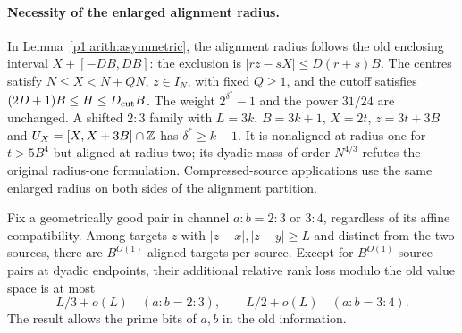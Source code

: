 \paragraph{Necessity of the enlarged alignment radius.}
In Lemma~\ref{p1:arith:asymmetric}, the alignment radius follows the
old enclosing interval $X+[-DB,DB]$: the exclusion is
$|rz-sX|\le D(r+s)B$. The centres satisfy
$N\le X<N+QN$, $z\in I_N$, with fixed $Q\ge1$, and the cutoff satisfies
$(2D+1)B\le H\le D_{\rm cut}B$. The weight $2^{\delta^*}-1$ and the
power $31/24$ are unchanged. A shifted $2:3$ family with
$L=3k$, $B=3k+1$, $X=2t$, $z=3t+3B$ and
$U_X=[X,X+3B]\cap\mathbb Z$ has $\delta^*\ge k-1$. It is nonaligned at
radius one for $t>5B^4$ but aligned at radius two; its dyadic mass
of order $N^{4/3}$ refutes the original radius-one formulation.
Compressed-source applications use the same enlarged radius on both
sides of the alignment partition.

\begin{lemma}\label{p1:arith:palmrank}
Fix a geometrically good pair in channel $a:b=2:3$ or $3:4$, regardless
of its affine compatibility.  Among targets $z$ with
$|z-x|,|z-y|\geq L$ and distinct from the two sources, there are
$B^{O(1)}$ aligned targets per source.  Except for $B^{O(1)}$ source
pairs at dyadic endpoints, their additional relative rank loss modulo
the old value space is at most
\[
 L/3+o(L)\quad(a:b=2:3),\qquad
 L/2+o(L)\quad(a:b=3:4).
\]
The result allows the prime bits of $a,b$ in the old information.
\end{lemma}

